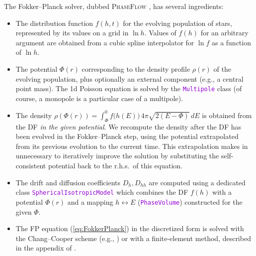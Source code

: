 \documentclass[12pt]{article}
\newcommand{\ttt}[1]{\textcolor{darkviolet}{\texttt{#1}}}
\begin{document}
The Fokker--Planck solver, dubbed \textsc{PhaseFlow} \cite{Vasiliev2017}, has several ingredients:
\begin{itemize}
\item The distribution function $f(h,t)$ for the evolving population of stars, represented by its values on a grid in $\ln h$. Values of $f(h)$ for an arbitrary argument are obtained from a cubic spline interpolator for $\ln f$ as a function of $\ln h$.
\item The potential $\Phi(r)$ corresponding to the density profile $\rho(r)$ of the evolving population, plus optionally an external component (e.g., a central point mass). The 1d Poisson equation is solved by the \ttt{Multipole} class (of course, a monopole is a particular case of a multipole).
\item The density $\rho(\Phi(r)) = \int_{\Phi}^0 f\big(h(E)\big)\,4\pi\sqrt{2(E-\Phi)}\,dE$ is obtained from the DF \textit{in the given potential}. We recompute the density after the DF has been evolved in the Fokker--Planck step, using the potential extrapolated from its previous evolution to the current time. This extrapolation makes in unnecessary to iteratively improve the solution by substituting the self-consistent potential back to the r.h.s.\ of this equation.
\item The drift and diffusion coefficients $D_h, D_{hh}$ are computed using a dedicated class \ttt{SphericalIsotropicModel} which combines the DF $f(h)$ with a potential $\Phi(r)$ and a mapping $h\leftrightarrow E$ (\ttt{PhaseVolume}) constructed for the given $\Phi$.
\item The FP equation (\ref{eq:FokkerPlanck}) in the discretized form is solved with the Chang--Cooper scheme (e.g., \cite{ParkPetrosian1996}) or with a finite-element method, described in the appendix of \cite{Vasiliev2017}.
\end{itemize}

\newpage
{}
\end{document}
